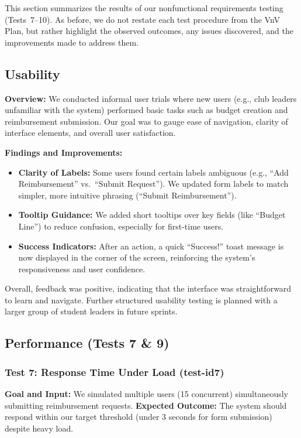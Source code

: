 \documentclass[12pt, titlepage]{article}
\begin{document}
This section summarizes the results of our nonfunctional requirements testing (Tests~7--10). As before, we do not restate each test procedure from the VnV Plan, but rather highlight the observed outcomes, any issues discovered, and the improvements made to address them. 

\subsection{Usability}

\noindent
\textbf{Overview:}  
We conducted informal user trials where new users (e.g., club leaders unfamiliar with the system) performed basic tasks such as budget creation and reimbursement submission. Our goal was to gauge ease of navigation, clarity of interface elements, and overall user satisfaction.

\noindent
\textbf{Findings and Improvements:}
\begin{itemize}
  \item \textbf{Clarity of Labels:} Some users found certain labels ambiguous (e.g., “Add Reimbursement” vs.\ “Submit Request”). We updated form labels to match simpler, more intuitive phrasing (``Submit Reimbursement'').
  \item \textbf{Tooltip Guidance:} We added short tooltips over key fields (like “Budget Line”) to reduce confusion, especially for first-time users.
  \item \textbf{Success Indicators:} After an action, a quick “Success!” toast message is now displayed in the corner of the screen, reinforcing the system’s responsiveness and user confidence.
\end{itemize}
Overall, feedback was positive, indicating that the interface was straightforward to learn and navigate. Further structured usability testing is planned with a larger group of student leaders in future sprints.

\subsection{Performance (Tests 7 \& 9)}

\subsubsection{Test 7: Response Time Under Load (test-id7)}

\noindent
\textbf{Goal and Input:}  
We simulated multiple users (15 concurrent) simultaneously submitting reimbursement requests.  
\textbf{Expected Outcome:} The system should respond within our target threshold (under 3 seconds for form submission) despite heavy load.
\end{document}
